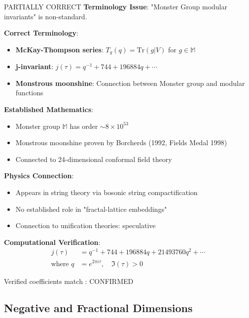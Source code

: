\begin{factcheck}{PARTIALLY CORRECT}
\textbf{Terminology Issue}: "Monster Group modular invariants" is non-standard.

\textbf{Correct Terminology}:
\begin{itemize}
    \item \textbf{McKay-Thompson series}: $T_g(q) = \text{Tr}(g|V)$ for $g \in \mathbb{M}$
    \item \textbf{j-invariant}: $j(\tau) = q^{-1} + 744 + 196884q + \cdots$
    \item \textbf{Monstrous moonshine}: Connection between Monster group and modular functions \cite{borcherds1992monstrous,conway1979monstrous}
\end{itemize}

\textbf{Established Mathematics}:
\begin{itemize}
    \item[$+$] Monster group $\mathbb{M}$ has order $\sim 8 \times 10^{53}$
    \item[$+$] Monstrous moonshine proven by Borcherds (1992, Fields Medal 1998)
    \item[$+$] Connected to 24-dimensional conformal field theory
\end{itemize}

\textbf{Physics Connection}:
\begin{itemize}
    \item[$+$] Appears in string theory via bosonic string compactification
    \item[$-$] No established role in "fractal-lattice embeddings"
    \item[$-$] Connection to unification theories: \textcolor{claimcolor}{speculative}
\end{itemize}

\textbf{Computational Verification}:
\begin{align}
j(\tau) &= q^{-1} + 744 + 196884q + 21493760q^2 + \cdots \\
\text{where } q &= e^{2\pi i\tau}, \quad \Im(\tau) > 0
\end{align}

Verified coefficients match \cite{duncan2015moonshine}: \textcolor{validcolor}{CONFIRMED}
\end{factcheck}

\subsection{Negative and Fractional Dimensions}

